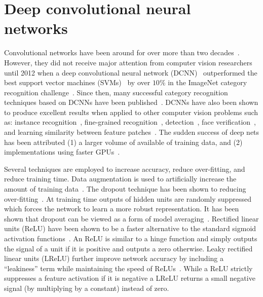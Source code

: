 
\section{Deep convolutional neural networks}\label{sec:dcnn}
    Convolutional networks have been around for over more than two decades~\cite{lecun_gradient_based_1998,
      fukushima_neocognitron_1988}.
    However, they did not receive major attention from computer vision researchers until 2012 when a deep
      convolutional neural network (DCNN)~\cite{krizhevsky_imagenet_2012} outperformed the best support vector
      machines (SVMs)~\cite{vapnik_statistical_1998} by over $10\percent$ in the ImageNet category recognition
      challenge~\cite{russakovsky_imagenet_2014}.
    Since then, many successful category recognition techniques based on DCNNs have been
      published~\cite{simonyan_very_2014, chatfield_efficient_2014, chatfield_return_2014, oquab_learning_2014,
      szegedy_going_2014, long_convnets_2014, he_spatial_2014, dean_fast_2013}.
    DCNNs have also been shown to produce excellent results when applied to other computer vision problems such
      as: %
    instance recognition~\cite{razavian_cnn_2014, razavian_baseline_2015, liu_learning_2015,
      held_deep_2015,arandjelovic_netvlad_2016,radenovic_cnn_2016}, %
    fine-grained recognition~\cite{branson_bird_2014, donahue_decaf_2013, catherine_wah_similarity_2014}, %
    detection~\cite{girshick_rich_2014, sermanet_overfeat_2013, li_wan_end_end_2015}, %
    face verification~\cite{huang_learning_2012, taigman_deepface_2014, sun_deep_2013}, %
    and learning similarity between feature patches~\cite{osendorfer_convolutional_2013, han_matchnet_2015,
      ng_exploiting_2015, zagoruyko_learning_2015, han_matchnet_2015}.
    The sudden success of deep nets has been attributed
    (1) a larger volume of available of training data, and
    (2) implementations using faster GPUs~\cite{krizhevsky_imagenet_2012}.
      
    Several techniques are employed to increase accuracy, reduce over-fitting,  and reduce training time.
    Data augmentation is used to artificially increase the amount of training
      data~\cite{ciresan_multi_column_2012, ciresan_high_performance_2011, simard_best_2003}.
    The dropout technique has been shown to reducing over-fitting~\cite{dahl_improving_2013,
      srivastava_dropout_2014}.
    At training time outputs of hidden units are randomly suppressed which forces the network to learn a more
      robust representation.
    It has been shown that dropout can be viewed as a form of model averaging~\cite{hinton_improving_2012}.
    Rectified linear units (ReLU) have been shown to be a faster alternative to the standard sigmoid activation
      functions~\cite{vinod_rectified_2010, dahl_improving_2013}.
    An ReLU is similar to a hinge function and simply outputs the signal of a unit if it is positive and outputs
      a zero otherwise.
    Leaky rectified linear units (LReLU) further improve network accuracy by including a ``leakiness'' term while
      maintaining the speed of ReLUs~\cite{maas_rectifier_2013}.
    While a ReLU strictly suppresses a feature activation if it is negative a LReLU returns a small negative
      signal (by multiplying by a constant) instead of zero.

